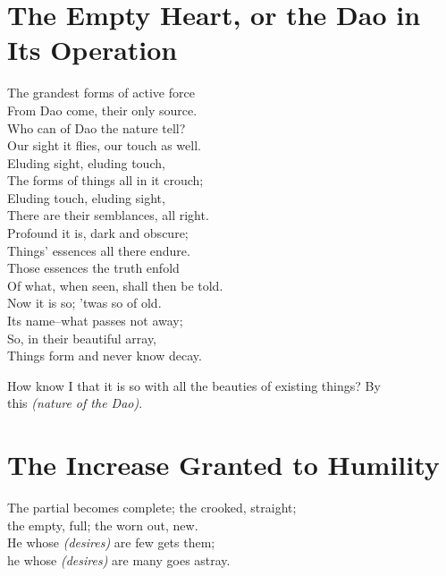 \section*{The Empty Heart, or the Dao in Its Operation}
    The grandest forms of active force\\
    From Dao come, their only source.\\
    Who can of Dao the nature tell?\\
    Our sight it flies, our touch as well.\\
    Eluding sight, eluding touch,\\
    The forms of things all in it crouch;\\
    Eluding touch, eluding sight,\\
    There are their semblances, all right.\\
    Profound it is, dark and obscure;\\
    Things' essences all there endure.\\
    Those essences the truth enfold\\
    Of what, when seen, shall then be told.\\
    Now it is so; 'twas so of old.\\
    Its name--what passes not away;\\
    So, in their beautiful array,\\
    Things form and never know decay.\vspace{\baselineskip}
    
    How know I that it is so with all the beauties of existing things? By\\
    this \textit{(nature of the Dao)}.\vspace{\baselineskip}
    \newpage{}
\section*{The Increase Granted to Humility}
    The partial becomes complete; the crooked, straight;\\
    the empty, full; the worn out, new.\\
    He whose \textit{(desires)} are few gets them;\\
    he whose \textit{(desires)} are many goes astray.\vspace{\baselineskip}
    
